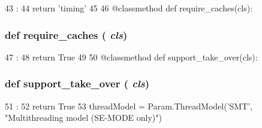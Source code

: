 \begin{DoxyCode}
43                         :
44         return 'timing'
45 
46     @classmethod
    def require_caches(cls):
\end{DoxyCode}
\hypertarget{classInOrderCPU_1_1InOrderCPU_afcb2c5440cbf782e304bdb958eadf744}{
\subsubsection[{require\_\-caches}]{\setlength{\rightskip}{0pt plus 5cm}def require\_\-caches ( {\em cls})}}
\label{classInOrderCPU_1_1InOrderCPU_afcb2c5440cbf782e304bdb958eadf744}



\begin{DoxyCode}
47                            :
48         return True
49 
50     @classmethod
    def support_take_over(cls):
\end{DoxyCode}
\hypertarget{classInOrderCPU_1_1InOrderCPU_aa201537acf29724056129b8efad43371}{
\subsubsection[{support\_\-take\_\-over}]{\setlength{\rightskip}{0pt plus 5cm}def support\_\-take\_\-over ( {\em cls})}}
\label{classInOrderCPU_1_1InOrderCPU_aa201537acf29724056129b8efad43371}



\begin{DoxyCode}
51                               :
52         return True
53 
    threadModel = Param.ThreadModel('SMT', "Multithreading model (SE-MODE only)")
      
\end{DoxyCode}


